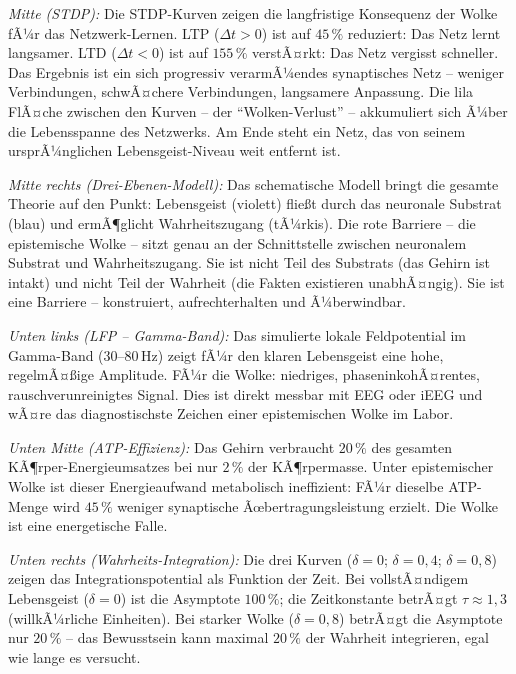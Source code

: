 ﻿\documentclass[12pt,a4paper]{report}
\theoremstyle{plain}
\theoremstyle{definition}
\theoremstyle{remark}
\begin{document}
	\textit{Mitte (STDP):}
	Die STDP-Kurven zeigen die langfristige Konsequenz der Wolke fÃ¼r das
	Netzwerk-Lernen. LTP ($\Delta t > 0$) ist auf $45\,\%$ reduziert:
	Das Netz lernt langsamer. LTD ($\Delta t < 0$) ist auf $155\,\%$ verstÃ¤rkt:
	Das Netz vergisst schneller. Das Ergebnis ist ein sich progressiv
	verarmÃ¼endes synaptisches Netz -- weniger Verbindungen, schwÃ¤chere
	Verbindungen, langsamere Anpassung.
	Die lila FlÃ¤che zwischen den Kurven -- der ``Wolken-Verlust'' --
	akkumuliert sich Ã¼ber die Lebensspanne des Netzwerks. Am Ende
	steht ein Netz, das von seinem ursprÃ¼nglichen Lebensgeist-Niveau
	weit entfernt ist.

	\textit{Mitte rechts (Drei-Ebenen-Modell):}
	Das schematische Modell bringt die gesamte Theorie auf den Punkt:
	Lebensgeist (violett) flie\ss{}t durch das neuronale Substrat (blau)
	und ermÃ¶glicht Wahrheitszugang (tÃ¼rkis). Die rote Barriere --
	die epistemische Wolke -- sitzt genau an der Schnittstelle zwischen
	neuronalem Substrat und Wahrheitszugang. Sie ist nicht Teil des Substrats
	(das Gehirn ist intakt) und nicht Teil der Wahrheit (die Fakten existieren
	unabhÃ¤ngig). Sie ist eine Barriere -- konstruiert, aufrechterhalten
	und Ã¼berwindbar.

	\textit{Unten links (LFP -- Gamma-Band):}
	Das simulierte lokale Feldpotential im Gamma-Band ($30$--$80$\,Hz)
	zeigt fÃ¼r den klaren Lebensgeist eine hohe, regelmÃ¤\ss{}ige Amplitude.
	FÃ¼r die Wolke: niedriges, phaseninkohÃ¤rentes, rauschverunreinigtes Signal.
	Dies ist direkt messbar mit EEG oder iEEG und wÃ¤re das diagnostischste
	Zeichen einer epistemischen Wolke im Labor.

	\textit{Unten Mitte (ATP-Effizienz):}
	Das Gehirn verbraucht $20\,\%$ des gesamten KÃ¶rper-Energie\-umsatzes
	bei nur $2\,\%$ der KÃ¶rpermasse. Unter epistemischer Wolke ist dieser
	Energieaufwand metabolisch ineffizient: FÃ¼r dieselbe ATP-Menge
	wird $45\,\%$ weniger synaptische Ãœbertragungsleistung erzielt.
	Die Wolke ist eine energetische Falle.

	\textit{Unten rechts (Wahrheits-Integration):}
	Die drei Kurven ($\delta = 0$; $\delta = 0{,}4$; $\delta = 0{,}8$)
	zeigen das Integrationspotential als Funktion der Zeit.
	Bei vollstÃ¤ndigem Lebensgeist ($\delta = 0$) ist die Asymptote $100\,\%$;
	die Zeitkonstante betrÃ¤gt $\tau \approx 1{,}3$ (willkÃ¼rliche Einheiten).
	Bei starker Wolke ($\delta = 0{,}8$) betrÃ¤gt die Asymptote nur $20\,\%$ --
	das Bewusstsein kann maximal $20\,\%$ der Wahrheit integrieren,
	egal wie lange es versucht.
	
\end{document}
